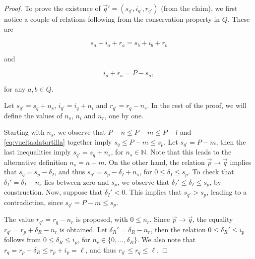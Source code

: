 \begin{proof}


To prove the existence of $\vec{q}'=(s_{q'},i_{q'},r_{q'})$ (from the claim), we first notice a couple of relations following from the conservation property in $Q$. These are

\begin{equation}
\label{eq:conservation}
    s_a+i_a+r_a=s_{b}+i_{b}+r_{b}
\end{equation}

and

\begin{equation}
\label{eq:vueltaalatortilla}
    i_a+r_a=P-s_a,
\end{equation}

for any $a,b \in Q$.


Let $s_{q'}=s_q+n_s$, $i_{q'}=i_q+n_i$ and $r_{q'}=r_q-n_r$. In the rest of the proof, we will define the values of $n_s$, $n_i$ and $n_r$, one by one.




Starting with $n_s$, we observe that $P-n\leq P-m \leq P-l$ and \eqref{eq:vueltaalatortilla} together imply $s_q\leq P-m\leq s_p$. Let $s_{q'}=P-m$, then the last inequalities imply $s_{q'}=s_q+n_s$, for $n_s\in \mathbb{N}$. Note that this leads to the alternative definition $n_s=n-m$. On the other hand, the relation $\vec{p} \rightarrow \vec{q}$ implies that $s_{q}=s_p- \delta_I$, and thus $s_{q'}=s_p- \delta_I+n_s$, for $0 \leq \delta_I \leq s_p$. To check that $\delta_I'=\delta_I-n_s$ lies between zero and $s_p$, we observe that $\delta_I'\leq \delta_I\leq s_p$, by construction. Now, suppose that $\delta_I'<0$. This implies that $s_{q'}>s_p$, leading to a contradiction, since $s_{q'}=P-m\leq s_p$. 



The value $r_{q'}=r_{q}-n_r$ is proposed, with $0\leq n_r$. Since $\vec{p} \rightarrow \vec{q}$, the equality $r_{q'}=r_{p}+\delta_R-n_r$ is obtained. Let $\delta_R'=\delta_R-n_r$, then the relation $0\leq \delta_R'\leq i_p$ follows from
$0 \leq \delta_R \leq i_p$, for $n_r\in \{0, \ldots, \delta_R\}$. We also note that $r_q = r_p+\delta_R \leq r_p+i_p =\ell$, and thus $r_{q'}\leq r_{q}\leq \ell$.



\end{proof}
